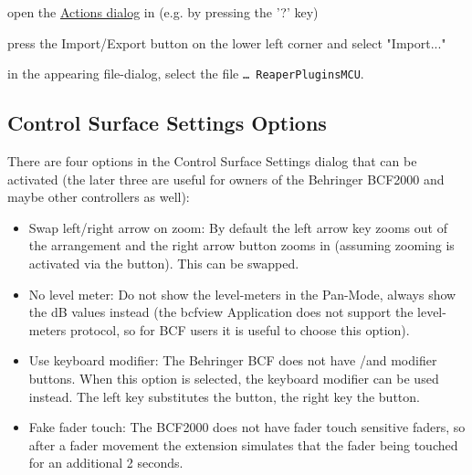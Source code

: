 \begin{compactitem}
\item open the \hyperref[F:actiondialog]{Actions dialog} in
  \reaper(e.g. by pressing the '?' key)
\item press the Import/Export button on the lower left corner and select
  "Import..."
\item in the appearing file-dialog, select the file {\tt \ldots\tbs
    Reaper\tbs Plugins\tbs MCU}.
\end{compactitem}

\subsection{Control Surface Settings Options}\label{settings}
There are four options in the Control Surface Settings dialog that can
be activated (the later three are useful for owners of the Behringer
BCF2000 and maybe other controllers as well):
\begin{itemize}
\item Swap left/right arrow on zoom: By default the left arrow key
  zooms out of the arrangement and the right arrow button zooms in (assuming
  zooming is activated via the \zoom button). This can be swapped.

\item No level meter: Do not show the level-meters in the Pan-Mode,
  always show the dB values instead (the bcfview Application does not
  support the level-meters protocol, so for BCF users it is useful to
  choose this option).
\item Use keyboard modifier: The Behringer BCF does not have 
  \option/\control and \alt modifier buttons. When this option is
  selected, the keyboard modifier can be used instead. The left
  \alt key substitutes the \alt button, the right \alt key the
  \option button.
\item Fake fader touch: The BCF2000 does not have fader touch sensitive
  faders, so after a fader movement the extension simulates that the
  fader being touched for an additional 2 seconds.
\end{itemize}


